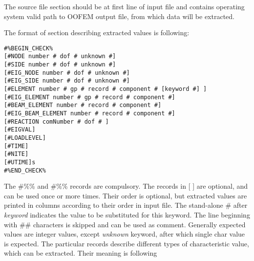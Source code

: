 The source file section should be at first line of input file and
contains operating system valid path to OOFEM output file, from which
data will be extracted.

The format of section describing extracted values is following:
\begin{verbatim}
#%BEGIN_CHECK%
[#NODE number # dof # unknown #]
[#SIDE number # dof # unknown #]
[#EIG_NODE number # dof # unknown #]
[#EIG_SIDE number # dof # unknown #]
[#ELEMENT number # gp # record # component # [keyword #] ]
[#EIG_ELEMENT number # gp # record # component #]
[#BEAM_ELEMENT number # record # component #]
[#EIG_BEAM_ELEMENT number # record # component #]
[#REACTION comNumber # dof # ]
[#EIGVAL]
[#LOADLEVEL]
[#TIME]
[#NITE]
[#UTIME]s
#%END_CHECK%
\end{verbatim}
The \#\%\% and \#\%\% records are compulsory.
The records in [ ] are optional, and can be used once or more
times. Their order is optional, but extracted values are printed in
columns according to their order in input file. The stand-alone \#
after {\em keyword} indicates the value to be substituted for this
keyword. The line beginning with \#\# characters is skipped and can be
used as comment. Generally expected values are integer values, except {\em
unknown} keyword, after which single char value is expected. The
particular records describe different types of characteristic value,
which can be extracted. Their meaning is following
